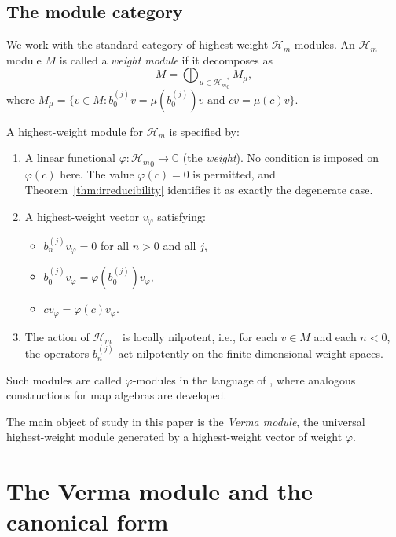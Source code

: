 \documentclass[12pt]{amsart}
\theoremstyle{plain}
\theoremstyle{definition}
\newcommand{\CC}{\mathbb{C}}
\newcommand{\Hm}{{\mathcal{H}_m}}     %
\begin{document}
\subsection{The module category}
\label{subsec:module-category}

We work with the standard category of highest-weight $\Hm$-modules.
An $\Hm$-module $M$ is called a \emph{weight module} if it decomposes as
\[
  M = \bigoplus_{\mu \in \Hm_0^*} M_\mu,
\]
where $M_\mu = \{v \in M : b_0^{(j)} v = \mu(b_0^{(j)}) v \text{ and } c v = \mu(c) v\}$.

A highest-weight module for $\Hm$ is specified by:
\begin{enumerate}
  \item A linear functional $\varphi : \Hm_0 \to \CC$ (the \emph{weight}).
        No condition is imposed on $\varphi(c)$ here. The value
        $\varphi(c) = 0$ is permitted, and
        Theorem~\ref{thm:irreducibility} identifies it as exactly the
        degenerate case.
  \item A highest-weight vector $v_\varphi$ satisfying:
        \begin{itemize}
          \item $b_n^{(j)} v_\varphi = 0$ for all $n > 0$ and all $j$,
          \item $b_0^{(j)} v_\varphi = \varphi(b_0^{(j)}) v_\varphi$,
          \item $c v_\varphi = \varphi(c) v_\varphi$.
        \end{itemize}
  \item The action of $\Hm_-$ is locally nilpotent, i.e.,
        for each $v \in M$ and each $n < 0$, the operators $b_n^{(j)}$
        act nilpotently on the finite-dimensional weight spaces.
\end{enumerate}
Such modules are called $\varphi$-modules in the language of \cite{CoxGuoLuZhao2016_Torus,BilligLau2011},
where analogous constructions for map algebras are developed.

The main object of study in this paper is the \emph{Verma module},
the universal highest-weight module generated by a highest-weight vector
of weight $\varphi$.


\section{The Verma module and the canonical form}
\label{sec:form}
\end{document}
